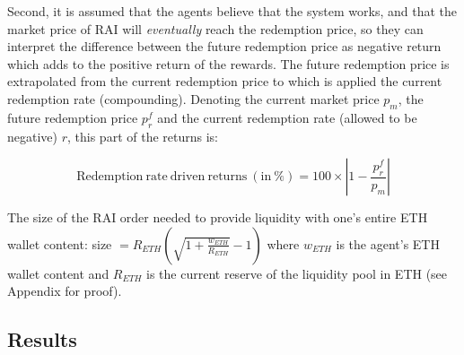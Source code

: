 \documentclass{article}
\begin{document}
    Second, it is assumed that the agents believe that the system works, and that the market price of RAI will \textit{eventually} reach the redemption price, so they can interpret the difference between the future redemption price as negative return which adds to the positive return of the rewards. The future redemption price is extrapolated from the current redemption price to which is applied the current redemption rate (compounding). Denoting the current market price $p_{m}$, the future redemption price $p^{f}_{r}$ and the current redemption rate (allowed to be negative) $r$, this part of the returns is:

    \begin{equation*}
      \mathrm{Redemption \ rate \ driven \ returns \ (in \ \%)} = 100 \times \left| 1 - \frac{p^{f}_{r}}{p_{m}} \right| 
    \end{equation*}

    The size of the RAI order needed to provide liquidity with one's entire ETH wallet content: size $ = R_{ETH}\left( \sqrt{1 + \frac{w_{ETH}}{R_{ETH}}} - 1 \right)$ where $w_{ETH}$ is the agent's ETH wallet content and $R_{ETH}$ is the current reserve of the liquidity pool in ETH (see Appendix for proof).

    \subsection{Results}
\end{document}
